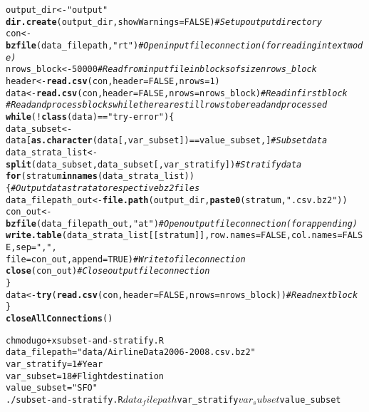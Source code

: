 \documentclass{article}\usepackage[]{graphicx}\usepackage[]{color}
\makeatletter
\newcommand{\hlnum}[1]{\textcolor[rgb]{0.686,0.059,0.569}{#1}}%
\newcommand{\hlstr}[1]{\textcolor[rgb]{0.192,0.494,0.8}{#1}}%
\newcommand{\hlcom}[1]{\textcolor[rgb]{0.678,0.584,0.686}{\textit{#1}}}%
\newcommand{\hlopt}[1]{\textcolor[rgb]{0,0,0}{#1}}%
\newcommand{\hlstd}[1]{\textcolor[rgb]{0.345,0.345,0.345}{#1}}%
\newcommand{\hlkwa}[1]{\textcolor[rgb]{0.161,0.373,0.58}{\textbf{#1}}}%
\newcommand{\hlkwb}[1]{\textcolor[rgb]{0.69,0.353,0.396}{#1}}%
\newcommand{\hlkwc}[1]{\textcolor[rgb]{0.333,0.667,0.333}{#1}}%
\newcommand{\hlkwd}[1]{\textcolor[rgb]{0.737,0.353,0.396}{\textbf{#1}}}%
\newenvironment{kframe}{%
 \def\at@end@of@kframe{}%
 \ifinner\ifhmode%
  \def\at@end@of@kframe{\end{minipage}}%
  \begin{minipage}{\columnwidth}%
 \fi\fi%
 \def\FrameCommand##1{\hskip\@totalleftmargin \hskip-\fboxsep
 \colorbox{shadecolor}{##1}\hskip-\fboxsep
     \hskip-\linewidth \hskip-\@totalleftmargin \hskip\columnwidth}%
 \MakeFramed {\advance\hsize-\width
   \@totalleftmargin\z@ \linewidth\hsize
   \@setminipage}}%
 {\par\unskip\endMakeFramed%
 \at@end@of@kframe}
\newenvironment{knitrout}{}{} %
\makeatother
\begin{document}
\begin{knitrout}
\begin{kframe}
\begin{alltt}
 \hlstd{output_dir} \hlkwb{<-} \hlstr{"output"}
 \hlkwd{dir.create}\hlstd{(output_dir,} \hlkwc{showWarnings} \hlstd{=} \hlnum{FALSE}\hlstd{)} \hlcom{# Set up output directory}
 \hlstd{con} \hlkwb{<-} \hlkwd{bzfile}\hlstd{(data_filepath,} \hlstr{"rt"}\hlstd{)} \hlcom{# Open input file connection (for reading in text mode)}
 \hlstd{nrows_block} \hlkwb{<-} \hlnum{50000} \hlcom{# Read from input file in blocks of size nrows_block}
 \hlstd{header} \hlkwb{<-} \hlkwd{read.csv}\hlstd{(con,} \hlkwc{header} \hlstd{=} \hlnum{FALSE}\hlstd{,} \hlkwc{nrows} \hlstd{=} \hlnum{1}\hlstd{)}
 \hlstd{data} \hlkwb{<-} \hlkwd{read.csv}\hlstd{(con,} \hlkwc{header} \hlstd{=} \hlnum{FALSE}\hlstd{,} \hlkwc{nrows} \hlstd{= nrows_block)} \hlcom{# Read in first block}
 \hlcom{# Read and process blocks while there are still rows to be read and processed}
 \hlkwa{while} \hlstd{(}\hlopt{!}\hlkwd{class}\hlstd{(data)} \hlopt{==} \hlstr{"try-error"}\hlstd{) \{}
   \hlstd{data_subset} \hlkwb{<-} \hlstd{data[}\hlkwd{as.character}\hlstd{(data[, var_subset])} \hlopt{==} \hlstd{value_subset, ]} \hlcom{# Subset data}
   \hlstd{data_strata_list} \hlkwb{<-} \hlkwd{split}\hlstd{(data_subset, data_subset[, var_stratify])} \hlcom{# Stratify data}
   \hlkwa{for} \hlstd{(stratum} \hlkwa{in} \hlkwd{names}\hlstd{(data_strata_list)) \{} \hlcom{# Output data strata to respective bz2 files}
     \hlstd{data_filepath_out} \hlkwb{<-} \hlkwd{file.path}\hlstd{(output_dir,} \hlkwd{paste0}\hlstd{(stratum,} \hlstr{".csv.bz2"}\hlstd{))}
     \hlstd{con_out} \hlkwb{<-} \hlkwd{bzfile}\hlstd{(data_filepath_out,} \hlstr{"at"}\hlstd{)} \hlcom{# Open output file connection (for appending)}
     \hlkwd{write.table}\hlstd{(data_strata_list[[stratum]],} \hlkwc{row.names} \hlstd{=} \hlnum{FALSE}\hlstd{,} \hlkwc{col.names} \hlstd{=} \hlnum{FALSE}\hlstd{,} \hlkwc{sep} \hlstd{=} \hlstr{","}\hlstd{,}
                 \hlkwc{file} \hlstd{= con_out,} \hlkwc{append} \hlstd{=} \hlnum{TRUE}\hlstd{)} \hlcom{# Write to file connection}
     \hlkwd{close}\hlstd{(con_out)} \hlcom{# Close output file connection}
   \hlstd{\}}
   \hlstd{data} \hlkwb{<-} \hlkwd{try}\hlstd{(}\hlkwd{read.csv}\hlstd{(con,} \hlkwc{header} \hlstd{=} \hlnum{FALSE}\hlstd{,} \hlkwc{nrows} \hlstd{= nrows_block))} \hlcom{# Read next block}
 \hlstd{\}}
 \hlkwd{closeAllConnections}\hlstd{()}
\end{alltt}
\end{kframe}
\end{knitrout}

\begin{knitrout}
\color{fgcolor}\begin{kframe}
\begin{alltt}
 chmod ugo+x subset-and-stratify.R
 data_filepath="data/AirlineData2006-2008.csv.bz2"
 var_stratify=1 # Year
 var_subset=18 # Flight destination
 value_subset="SFO"
 ./subset-and-stratify.R $data_filepath $var_stratify $var_subset $value_subset
\end{alltt}
\end{kframe}
\end{knitrout}
\end{document}
